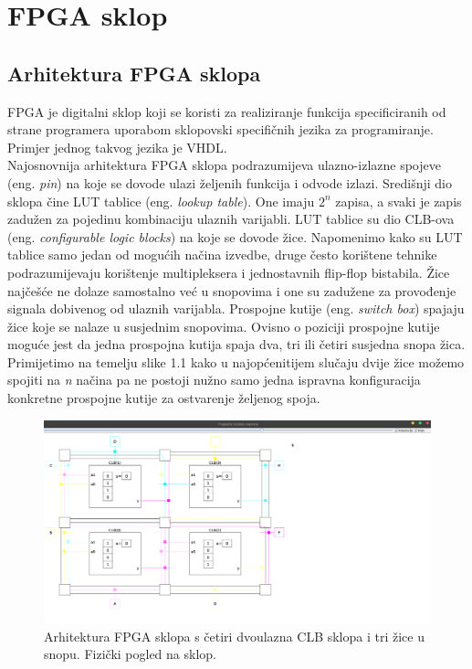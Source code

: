 \documentclass[times, utf8, zavrsni]{fer}
\begin{document}
	\section{FPGA sklop}
	
	\subsection{Arhitektura FPGA sklopa}
	
	FPGA je digitalni sklop koji se koristi za realiziranje funkcija specificiranih od strane programera uporabom sklopovski specifičnih jezika za programiranje. Primjer jednog takvog jezika je VHDL.\\ Najosnovnija arhitektura FPGA sklopa podrazumijeva ulazno-izlazne spojeve (eng. \emph{pin}) na koje se dovode ulazi željenih funkcija i odvode izlazi. Središnji dio sklopa čine LUT tablice (eng. \emph{lookup table}). One imaju $2^n$ zapisa, a svaki je zapis zadužen za pojedinu kombinaciju ulaznih varijabli. LUT tablice su dio CLB-ova (eng. \emph{configurable logic blocks}) na koje se dovode žice. Napomenimo kako su LUT tablice samo jedan od mogućih načina izvedbe, druge često korištene tehnike podrazumijevaju korištenje multipleksera i jednostavnih flip-flop bistabila. Žice najčešće ne dolaze samostalno već u snopovima i one su zadužene za provođenje signala dobivenog od ulaznih varijabla. Prospojne kutije (eng. \emph{switch box}) spajaju žice koje se nalaze u susjednim snopovima. Ovisno o poziciji prospojne kutije moguće jest da jedna prospojna kutija spaja dva, tri ili četiri susjedna snopa žica.\\ Primijetimo na temelju slike 1.1 kako u najopćenitijem slučaju dvije žice možemo spojiti na \emph{n} načina pa ne postoji nužno samo jedna ispravna konfiguracija konkretne prospojne kutije za ostvarenje željenog spoja.
	
	\begin{figure}[H]
		\centering
		\includegraphics[width=20cm]{slike/arhFPGA.png}
		\caption{Arhitektura FPGA sklopa s četiri dvoulazna CLB sklopa i tri žice u snopu. Fizički pogled na sklop.}
		\label{fig:arh-fpga}
	\end{figure}
	
\end{document}
